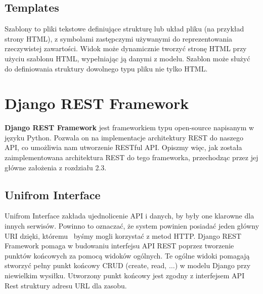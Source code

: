 \documentclass[oneside,polski,logo,indent]{amuthesis}
\begin{document}
\begin{center}
\subsection{Templates}
\end{center}
Szablony to pliki tekstowe definiujące strukturę lub układ pliku (na przykład strony HTML), z symbolami zastępczymi używanymi do reprezentowania rzeczywistej zawartości. Widok może dynamicznie tworzyć stronę HTML przy użyciu szablonu HTML, wypełniając ją danymi z modelu. Szablon może służyć do definiowania struktury dowolnego typu pliku nie tylko HTML.
\section{Django REST Framework}
\textbf{Django REST Framework} jest frameworkiem typu open-source napisanym w języku Python. Pozwala on na implementacje architektury REST do naszego API, co umożliwia nam utworzenie RESTful API. Opiszmy więc, jak została zaimplementowana architektura REST do tego frameworka, przechodząc przez jej główne założenia z rozdziału 2.3.
\begin{center}
\subsection{Unifrom Interface}
\end{center}
Unifrom Interface zakłada ujednolicenie API i danych, by były one klarowne dla innych serwisów. Powinno to oznaczać, że system powinien posiadać jeden główny URI dzięki, któremu~ byśmy mogli korzystać z metod HTTP. Django REST Framework pomaga w budowaniu interfejsu API REST poprzez tworzenie punktów końcowych za pomocą widoków ogólnych. Te ogólne widoki pomagają stworzyć pełny punkt końcowy CRUD (create, read, $\dots$) w modelu Django przy niewielkim wysiłku. Utworzony punkt końcowy jest zgodny z interfejsem API Rest struktury adresu URL dla zasobu. 
\end{document}
